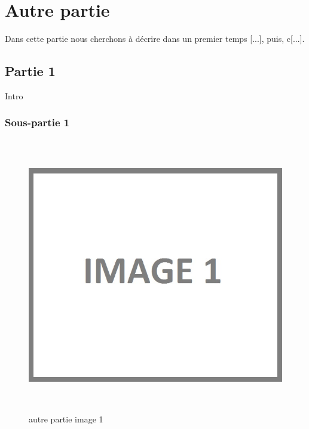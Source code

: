 \chapter{Autre partie}

Dans cette partie nous cherchons à décrire dans un premier temps [...], puis, c[...].

\section{Partie 1}

Intro

\subsection{Sous-partie 1}

\begin{figure}[!ht]
\begin{center}
\includegraphics[height=12cm]{autre_partie/image1}
\end{center}
\caption[autre partie générale]{autre partie image 1\protect\footnotemark}
\end{figure}


